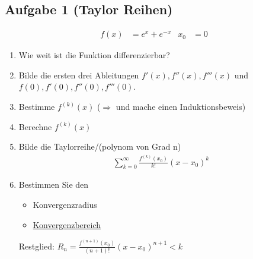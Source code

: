 \subsection{Aufgabe 1 (Taylor Reihen)}
\begin{align*}
    f(x) &= e^x + e^{-x} & x_0 &= 0
\end{align*}
\begin{enumerate}[label=Schritt \arabic*: ]
    \item Wie weit ist die Funktion differenzierbar?
    \item Bilde die ersten drei Ableitungen $f'(x), f''(x), f'''(x)$ und $f(0), f'(0), f''(0), f'''(0)$.
    \item Bestimme $f^{(k)}(x)$ ($\Rightarrow$ und mache einen Induktionsbeweis)
    \item Berechne $f^{(k)}(x)$
    \item Bilde die Taylorreihe/(polynom von Grad n)
    \begin{align*}
        \sum_{k = 0}^{\infty} \frac{f^{(k)}(x_0)}{k!} (x - x_0)^k
    \end{align*}
    \item Bestimmen Sie den
    \begin{itemize}
        \item Konvergenzradius
        \item \underline{Konvergenzbereich}
    \end{itemize}
    Restglied: $R_n = \frac{f^{(n+1)}(x_0)}{(n+1)!}(x - x_0)^{n+1} < k$
\end{enumerate}

